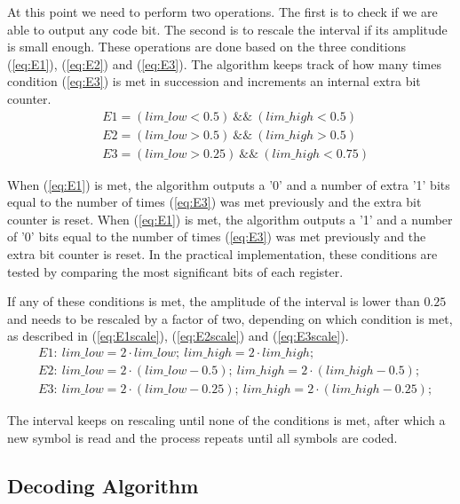 \begin{refsection}
At this point we need to perform two operations. The first is to check if we are able to output any code bit. The second is to rescale the interval if its amplitude is small enough. These operations are done based on the three conditions (\ref{eq:E1}), (\ref{eq:E2}) and (\ref{eq:E3}). The algorithm keeps track of how many times condition (\ref{eq:E3}) is met in succession and increments an internal extra bit counter.
\begin{eqnarray} 
\label{eq:E1} &E1 = (lim\_low < 0.5) \  \&\& \ (lim\_high < 0.5) \\
\label{eq:E2} &E2 = (lim\_low > 0.5) \ \&\& \ (lim\_high > 0.5) \\
\label{eq:E3} &E3 = (lim\_low > 0.25) \ \&\& \ (lim\_high < 0.75)
\end{eqnarray}

When (\ref{eq:E1}) is met, the algorithm outputs a '0' and a number of extra '1' bits equal to the number of times (\ref{eq:E3}) was met previously and the extra bit counter is reset. When (\ref{eq:E1}) is met, the algorithm outputs a '1' and a number of '0' bits equal to the number of times (\ref{eq:E3}) was met previously and the extra bit counter is reset. In the practical implementation, these conditions are tested by comparing the most significant bits of each register.

If any of these conditions is met, the amplitude of the interval is lower than $0.25$ and needs to be rescaled by a factor of two, depending on which condition is met, as described in (\ref{eq:E1scale}), (\ref{eq:E2scale}) and (\ref{eq:E3scale}).
\begin{eqnarray} 
\label{eq:E1scale} &E1:\ lim\_low = 2 \cdot lim\_low;\ lim\_high = 2 \cdot lim\_high;\\
\label{eq:E2scale} &E2:\ lim\_low = 2 \cdot (lim\_low-0.5);\ lim\_high = 2 \cdot (lim\_high-0.5); \\
\label{eq:E3scale} &E3:\ lim\_low = 2 \cdot (lim\_low-0.25);\ lim\_high = 2 \cdot (lim\_high-0.25);
\end{eqnarray}

The interval keeps on rescaling until none of the conditions is met, after which a new symbol is read and the process repeats until all symbols are coded.



\subsection{Decoding Algorithm}


\end{refsection}
